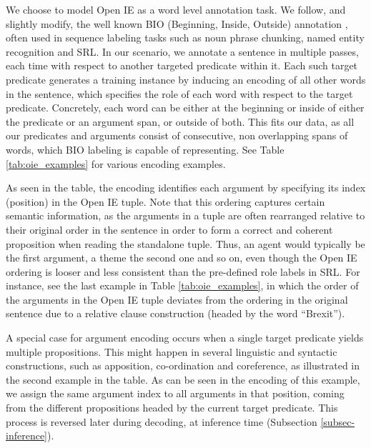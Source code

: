 We choose to model Open IE as a word level annotation task. We follow,  and slightly modify, the well known BIO (Beginning, Inside, Outside)  annotation \cite{ramshaw1995text,sang1999representing},
often used in sequence labeling tasks such as noun phrase chunking, named entity recognition and SRL.
In our scenario, we annotate a sentence in multiple passes, each time with respect to another targeted predicate within it. Each such target predicate generates a training instance by inducing an encoding of all other words
in the sentence, which specifies the role of each word with respect to the target predicate.
Concretely, each word can be either at the beginning or inside of either the predicate or an argument span, or outside of both.
This fits our data, as all our predicates and arguments consist of consecutive, non overlapping spans of words, which BIO labeling is capable of representing.
See Table \ref{tab:oie_examples} for various encoding examples.

As seen in the table, the encoding identifies each argument by specifying its index (position) in the Open IE tuple.
Note that this ordering captures certain semantic information, as the arguments in a tuple are often rearranged relative to their original order in the sentence in order to form
a correct and coherent proposition when reading the standalone tuple. Thus, an agent would typically be the first argument, a theme the second one and so on, even though the Open IE ordering is looser and less consistent than the pre-defined role labels in SRL.
For instance, see the last example in Table \ref{tab:oie_examples}, in which the order of the arguments
in the Open IE tuple deviates from the ordering in the original sentence due to
a relative clause construction (headed by the word ``Brexit'').

A special case for argument encoding occurs when a single target predicate yields multiple propositions.
This might happen in several linguistic and syntactic constructions, such as apposition, co-ordination and coreference, as illustrated in the second example in the table. As can be seen in the encoding of this example, we assign the same argument index to all arguments in that position, coming from the different propositions headed by the current target predicate. This process is reversed later during decoding, at inference time (Subsection \ref{subsec-inference}).

